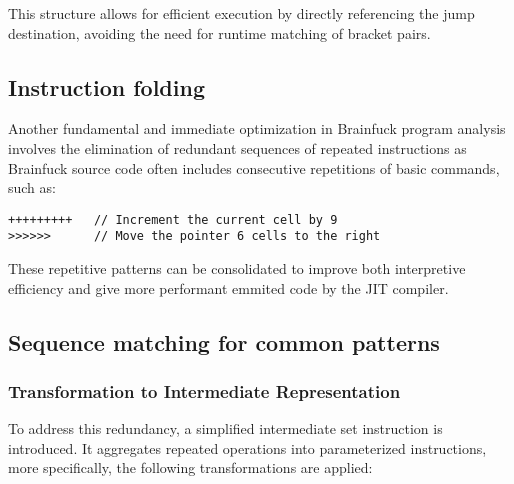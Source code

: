 \par This structure allows for efficient execution by directly referencing the jump destination, avoiding the need for runtime matching of bracket pairs.

\subsection{Instruction folding}
\label{subsec:ch2sec3sec2}

\par Another fundamental and immediate optimization in Brainfuck program analysis involves the elimination of redundant sequences of repeated instructions as Brainfuck source code often includes consecutive repetitions of basic commands, such as:

\begin{verbatim}
+++++++++   // Increment the current cell by 9
>>>>>>      // Move the pointer 6 cells to the right
\end{verbatim}

\par These repetitive patterns can be consolidated to improve both interpretive efficiency and give more performant emmited code by the JIT compiler.

\subsection{Sequence matching for common patterns}
\label{subsec:ch2sec3sec3}

\subsubsection*{Transformation to Intermediate Representation}

To address this redundancy, a simplified intermediate set instruction is introduced. It aggregates repeated operations into parameterized instructions, more specifically, the following transformations are applied:

